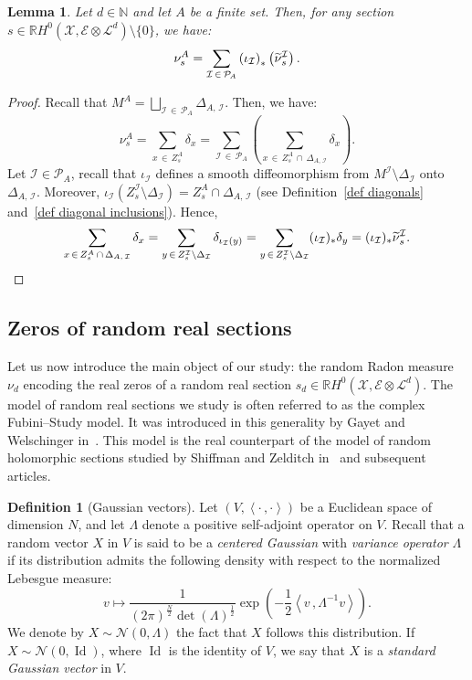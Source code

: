 \documentclass[10pt]{amsart}
\newtheorem{lemm}[theo]{Lemma}\newtheorem{prop}[theo]{Proposition}\newtheorem{coro}[theo]{Corollary}\newtheorem{conj}[theo]{Conjecture}
\theoremstyle{definition}\newtheorem{defi}[theo]{Definition}\newtheorem{rema}[theo]{Remark}\newtheorem{exam}[theo]{Example}\newtheorem{exem}[theo]{Example}\newtheorem{nota}[theo]{Notation}
\DeclareMathOperator{\Id}{Id}
\newcommand{\E}{\mathcal{E}}
\newcommand{\I}{\mathcal{I}}
\newcommand{\X}{\mathcal{X}}
\renewcommand{\L}{\mathcal{L}}
\newcommand{\clN}{\mathcal{N}}
\newcommand{\pa}{\mathcal{P}\!}
\newcommand{\N}{\mathbb{N}}
\newcommand{\R}{\mathbb{R}}
\newcommand{\prsc}[2]{\left\langle #1\,, #2 \right\rangle}
\renewcommand{\H}{H^0(\X,\E \otimes \L^d)}
\renewcommand{\tilde}{\widetilde}
\let\oldtilde\tilde
\renewcommand*{\tilde}[1]{\mathchoice{\widetilde{#1}}{\widetilde{#1}}{\oldtilde{#1}}{\oldtilde{#1}}}
\begin{document}
\begin{lemm}\label{lem decomposition nu ks}
Let $d \in \N$ and let $A$ be a finite set. Then, for any section $s \in \R\H \setminus \{0\}$, we have:
\[
\nu^A_s = \sum_{\I\,\in\,\pa_A} \left(\iota_\I\right)_*\left(\tilde{\nu}^\I_s\right).
\]
\end{lemm}

\begin{proof}
Recall that $M^A = \bigsqcup_{\I\,\in\,\pa_A} \Delta_{A,\,\I}$. Then, we have:
\[
\nu^A_s = \sum_{x\,\in\,Z_s^A} \delta_x = \sum_{\I\,\in\,\pa_A} \left(\sum_{x\,\in\,Z_s^A\,\cap\,\Delta_{A,\,\I}} \delta_x\right).
\]
Let $\I \in \pa_A$, recall that $\iota_\I$ defines a smooth diffeomorphism from $M^\I \setminus \Delta_\I$ onto $\Delta_{A,\,\I}$. Moreover, $\iota_\I(Z^\I_s\setminus \Delta_\I) = Z^A_s \cap \Delta_{A,\,\I}$ (see Definition~\ref{def diagonals} and~\ref{def diagonal inclusions}). Hence,
\[
\sum_{x\,\in\,Z_s^A\,\cap\,\Delta_{A,\,\I}} \delta_x = \sum_{y\,\in\,Z^\I_s \setminus \Delta_\I} \delta_{\iota_\I(y)} = \sum_{y\,\in\,Z^\I_s \setminus \Delta_\I} (\iota_\I)_*\delta_y = (\iota_\I)_*\tilde{\nu}^\I_s.\qedhere
\]
\end{proof}



\subsection{Zeros of random real sections}\label{subsec zeros of random real sections}

Let us now introduce the main object of our study: the random Radon measure $\nu_d$ encoding the real zeros of a random real section $s_d \in \R\H$. The model of random real sections we study is often referred to as the complex Fubini--Study model. It was introduced in this generality by Gayet and Welschinger in~\cite{GW2011}. This model is the real counterpart of the model of random holomorphic sections studied by Shiffman and Zelditch in~\cite{SZ1999} and subsequent articles.

\begin{defi}[{Gaussian vectors}]\label{def Gaussian distribution}
Let $(V,\prsc{\cdot}{\cdot})$ be a Euclidean space of dimension $N$, and let $\Lambda$ denote a positive self-adjoint operator on $V$. Recall that a random vector $X$ in $V$ is said to be a \emph{centered Gaussian} with \emph{variance operator} $\Lambda$ if its distribution admits the following density with respect to the normalized Lebesgue measure:
\[
v \mapsto \frac{1}{(2\pi)^\frac{N}{2} \det(\Lambda)^\frac{1}{2}} \exp\left(-\frac{1}{2}\prsc{v}{\Lambda^{-1}v}\right).
\]
We denote by $X \sim \clN(0,\Lambda)$ the fact that $X$ follows this distribution. If $X \sim \clN(0,\Id)$, where $\Id$ is the identity of $V$, we say that $X$ is a \emph{standard Gaussian vector} in $V$.
\end{defi}
\end{document}
